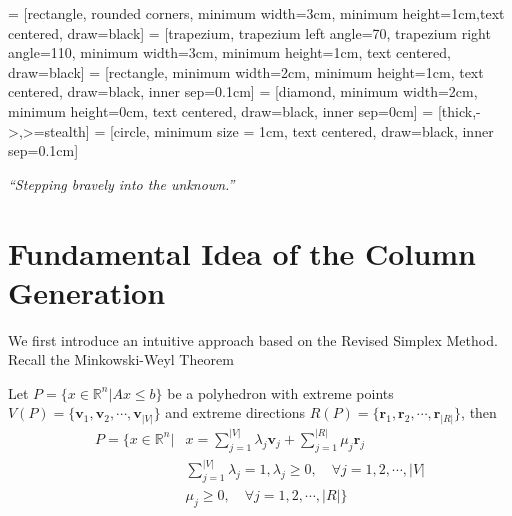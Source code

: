 
\usepackage{makecell}

\usetikzlibrary{shapes.geometric, arrows}
     = [rectangle, rounded corners, minimum width=3cm, minimum height=1cm,text centered, draw=black]
     = [trapezium, trapezium left angle=70, trapezium right angle=110, minimum width=3cm, minimum height=1cm, text centered, draw=black]
     = [rectangle, minimum width=2cm, minimum height=1cm, text centered, draw=black, inner sep=0.1cm]
     = [diamond, minimum width=2cm, minimum height=0cm, text centered, draw=black, inner sep=0cm]
     = [thick,->,>=stealth]
     = [circle, minimum size = 1cm, text centered, draw=black, inner sep=0.1cm]

\renewcommand{\docTitle}{Lecture 7 - Column Generation}
\renewcommand{\docAuthor}{Lan Peng, Ph.D.}
\renewcommand{\docAffil}{School of Management, Shanghai University, Shanghai, China}

    \titleSec

    \begin{center}
        \textit{``Stepping bravely into the unknown.''}
    \end{center}

    \section{Fundamental Idea of the Column Generation}
        We first introduce an intuitive approach based on the Revised Simplex Method. Recall the Minkowski-Weyl Theorem

        \begin{theorem}
            Let $P = \{x \in \mathbb{R}^n | Ax \le b\}$ be a polyhedron with extreme points $V(P) = \{\mathbf{v}_1, \mathbf{v}_2, \cdots, \mathbf{v}_{|V|}\}$ and extreme directions $R(P) = \{\mathbf{r}_1, \mathbf{r}_2, \cdots, \mathbf{r}_{|R|}\}$, then
            \begin{align*}
                P = \{x \in \mathbb{R}^n |& x = \sum_{j = 1}^{|V|} \lambda_j \mathbf{v}_j + \sum_{j = 1}^{|R|} \mu_j \mathbf{r}_j \\
                & \sum_{j = 1}^{|V|} \lambda_j = 1, \lambda_j \ge 0, \quad \forall j = 1, 2, \cdots, |V| \\
                & \mu_j \ge 0, \quad \forall j = 1, 2, \cdots, |R|\}
            \end{align*}
        \end{theorem}

